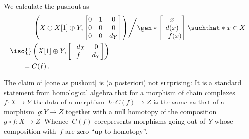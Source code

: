 \documentclass[a4paper,10pt]{scrartcl}
\begin{document}
We calculate the pushout as
\begin{align*}
  {}&
  \left.
  \left(
    X \oplus X[1] \oplus Y,
    \begin{bmatrix}
      0 & 1 & 0   \\
      0 & 0 & 0   \\
      0 & 0 & d_Y
    \end{bmatrix}
  \right)
  \middle/
  \gen*{
    \begin{bmatrix}
          x  \\
        d(x) \\
      -f(x)
    \end{bmatrix}
  \suchthat*
    x \in X
  }
  \right.
  \\
  \iso{}&
  \left(
    X[1] \oplus Y,
    \begin{bmatrix}
      -d_X & 0   \\
        f   & d_Y
    \end{bmatrix}
  \right)
  \\
  ={}&
  C(f) \,.
\end{align*}

\begin{remark}
  The claim of \cref{cone as pushout} is (a posteriori) not  surprising:
  It is a standard statement from homological algebra that for a morphism of chain complexes~$f \colon X \to Y$ the data of a morphism~$h \colon C(f) \to Z$ is the same as that of a morphism~$g \colon Y \to Z$ together with a null homotopy of the composition~$g \circ f \colon X \to Z$.
  Whence~$C(f)$ corepresents morphisms going out of~$Y$ whose composition with~$f$ are zero \enquote{up to homotopy}.
\end{remark}
\end{document}
